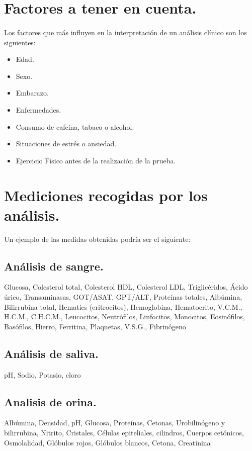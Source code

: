 \documentclass[a4paper,10pt]{article}
\begin{document}
\section{Factores a tener en cuenta.}
\label{section:factoresatenerencuenta}
\paragraph{}
Los factores que más influyen en la interpretación de un análisis clínico son los siguientes:
\begin{itemize}
\item Edad.
\item Sexo.
\item Embarazo.
\item Enfermedades.
\item Consumo de cafeína, tabaco o alcohol.
\item Situaciones de estrés o ansiedad.
\item Ejercicio Físico antes de la realización de la prueba.
\end{itemize}

\section{Mediciones recogidas por los análisis.}
Un ejemplo de las medidas obtenidas podría ser el siguiente:
\subsection{Análisis de sangre.}
Glucosa, Colesterol total, Colesterol HDL, Colesterol LDL, Triglicéridos, Ácido úrico, Transaminasas, GOT/ASAT, GPT/ALT, Proteínas totales, Albúmina, Bilirrubina total, Hematíes (eritrocitos), Hemoglobina, Hematocrito, V.C.M., H.C.M., C.H.C.M., Leucocitos, Neutrófilos, Linfocitos, Monocitos, Eosinófilos, Basófilos, Hierro, Ferritina, Plaquetas, V.S.G., Fibrinógeno \subsection{Análisis de saliva.}
pH, Sodio, Potasio, cloro
\subsection{Analisis de orina.}
Albúmina, Densidad, pH, Glucosa, Proteínas, Cetonas, Urobilinógeno y bilirrubina, Nitrito, Cristales, Células epiteliales, cilindros, Cuerpos cetónicos, Osmolalidad, Glóbulos rojos, Glóbulos blancos, Cetona, Creatinina
\pagebreak
\end{document}

